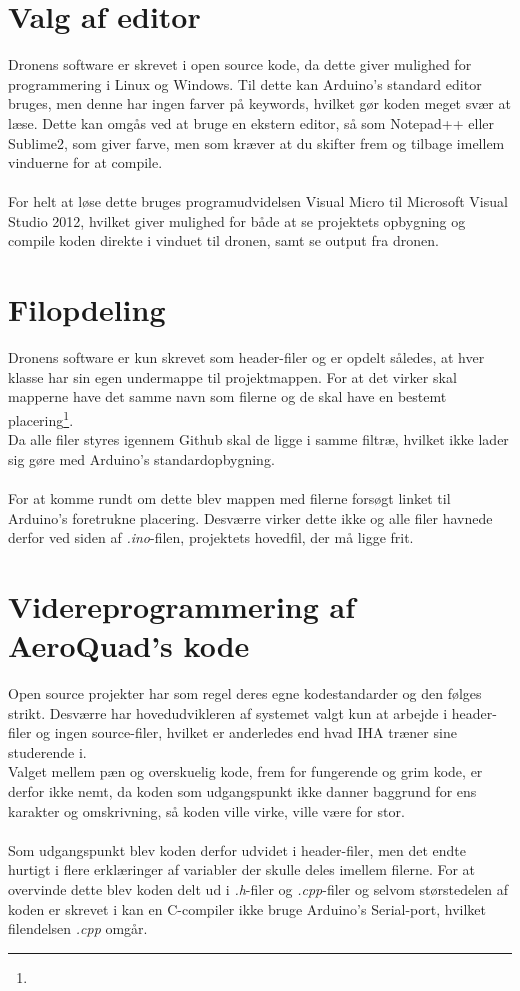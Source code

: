 \documentclass[Main]{subfiles}
\begin{document}
\section{Valg af editor}\label{sec:software}
Dronens software er skrevet i open source kode, da dette giver mulighed for programmering i Linux og Windows\cite{AQ-software}.
Til dette kan Arduino's standard editor bruges, men denne har ingen farver på keywords, hvilket gør koden meget svær at læse.
Dette kan omgås ved at bruge en ekstern editor, så som Notepad++ eller Sublime2, som giver farve, men som kræver at du skifter frem og tilbage imellem vinduerne for at compile.
\\
\\
For helt at løse dette bruges programudvidelsen Visual Micro\cite{VM} til Microsoft Visual Studio 2012, hvilket giver mulighed for både at se projektets opbygning og compile koden direkte i vinduet til dronen, samt se output fra dronen.



\section{Filopdeling}
Dronens software er kun skrevet som header-filer og er opdelt således, at hver klasse har sin egen undermappe til projektmappen.
For at det virker skal mapperne have det samme navn som filerne og de skal have en bestemt placering\footnote{}.
\\
Da alle filer styres igennem Github skal de ligge i samme filtræ, hvilket ikke lader sig gøre med Arduino's standardopbygning.
\\
\\
For at komme rundt om dette blev mappen med filerne forsøgt linket til Arduino's foretrukne  placering.
Desværre virker dette ikke og alle filer havnede derfor ved siden af \textit{.ino}-filen, projektets hovedfil, der må ligge frit.


\section{Videreprogrammering af AeroQuad's kode}
Open source projekter har som regel deres egne kodestandarder og den følges strikt.
Desværre har hovedudvikleren af systemet valgt kun at arbejde i header-filer og ingen source-filer, hvilket er anderledes end hvad IHA træner sine studerende i.
\\
Valget mellem pæn og overskuelig kode, frem for fungerende og grim kode, er derfor ikke nemt, da koden som udgangspunkt ikke danner baggrund for ens karakter og omskrivning, så koden ville virke, ville være for stor.
\\
\\
Som udgangspunkt blev koden derfor udvidet i header-filer, men det endte hurtigt i flere erklæringer af variabler der skulle deles imellem filerne. 
For at overvinde dette blev koden delt ud i \textit{.h}-filer og \textit{.cpp}-filer og selvom størstedelen af koden er skrevet i  kan en C-compiler ikke bruge Arduino's Serial-port, hvilket filendelsen \textit{.cpp} omgår.
\end{document}
